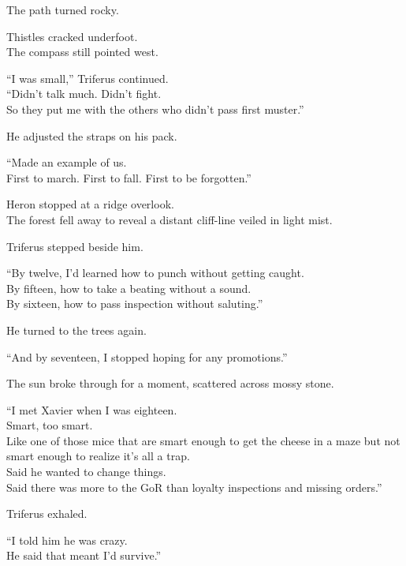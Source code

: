 \documentclass[9pt]{article}
\begin{document}
\vspace{1em}

The path turned rocky.

Thistles cracked underfoot.\\
The compass still pointed west.

“I was small,” Triferus continued.\\
“Didn’t talk much. Didn’t fight.\\
So they put me with the others who didn’t pass first muster.”

He adjusted the straps on his pack.

“Made an example of us.\\
First to march. First to fall. First to be forgotten.”

\vspace{1em}

Heron stopped at a ridge overlook.\\
The forest fell away to reveal a distant cliff-line veiled in light mist.

Triferus stepped beside him.

“By twelve, I’d learned how to punch without getting caught.\\
By fifteen, how to take a beating without a sound.\\
By sixteen, how to pass inspection without saluting.”

He turned to the trees again.

“And by seventeen, I stopped hoping for any promotions.”

\vspace{1em}

The sun broke through for a moment, scattered across mossy stone.

“I met Xavier when I was eighteen.\\
Smart, too smart.\\
Like one of those mice that are smart enough to get the cheese in a maze but not smart enough to realize it's all a trap.\\
Said he wanted to change things.\\
Said there was more to the GoR than loyalty inspections and missing orders.”

Triferus exhaled.

“I told him he was crazy.\\
He said that meant I’d survive.”

\vspace{1em}
\end{document}
